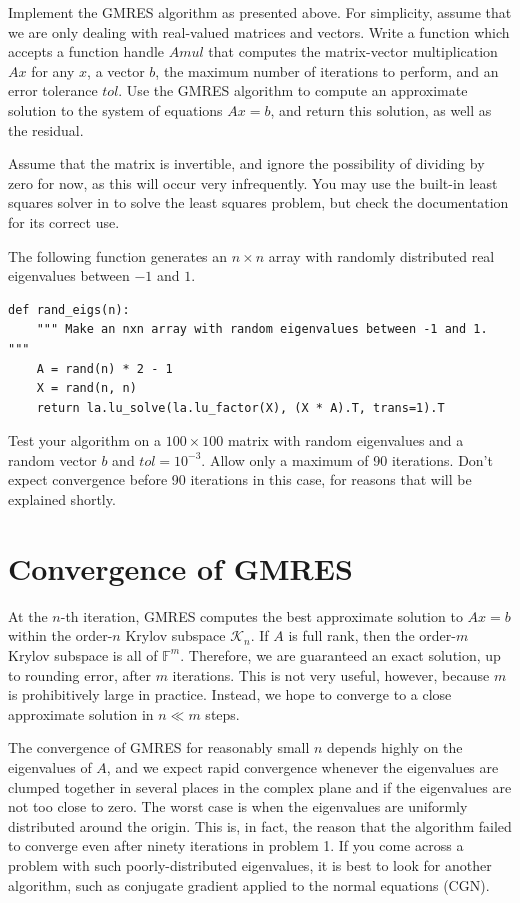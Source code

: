 \begin{problem}
Implement the GMRES algorithm as presented above. For simplicity, assume that we are only dealing with real-valued matrices and vectors.
Write a function  which accepts a function handle $Amul$ that computes the matrix-vector multiplication $Ax$ for any $x$,
a vector $b$, the maximum number of iterations to perform, and an error tolerance $tol$.
Use the GMRES algorithm to compute an approximate solution to the system of equations $Ax = b$, and return this solution, as well as
the residual.

Assume that the matrix is invertible, and ignore the possibility of dividing by zero for now, as this will occur very infrequently.
You may use the built-in least squares solver in  to solve the least squares problem, but check the documentation
for its correct use.

The following function generates an $n \times n$ array with randomly distributed real eigenvalues between $-1$ and $1$.
\begin{lstlisting}
def rand_eigs(n):
    """ Make an nxn array with random eigenvalues between -1 and 1. """
    A = rand(n) * 2 - 1
    X = rand(n, n)
    return la.lu_solve(la.lu_factor(X), (X * A).T, trans=1).T
\end{lstlisting}

Test your algorithm on a $100\times 100$ matrix with random eigenvalues and a random vector $b$ and $tol=10^{-3}$.
Allow only a maximum of 90 iterations.
Don't expect convergence before 90 iterations in this case, for reasons that will be explained shortly.
\label{prob:MyGMRES}
\end{problem}

\section*{Convergence of GMRES}
At the $n$-th iteration, GMRES computes the best approximate solution to $Ax = b$ within the order-$n$ Krylov subspace
$\mathcal{K}_n$.
If $A$ is full rank, then the order-$m$ Krylov subspace is all of  $\mathbb{F}^m$.
Therefore, we are guaranteed an exact solution, up to rounding error, after $m$ iterations.
This is not very useful, however, because $m$ is prohibitively large in practice.
Instead, we hope to converge to a close approximate solution in $n \ll m$ steps.

The convergence of GMRES for reasonably small $n$ depends highly on the eigenvalues of $A$, and we expect rapid convergence whenever
the eigenvalues are clumped together in several places in the complex plane and if the eigenvalues are not too close to zero.
The worst case is when the eigenvalues are uniformly distributed around the origin.
This is, in fact, the reason that the algorithm failed to converge even after ninety iterations in problem 1.
If you come across a problem with such poorly-distributed eigenvalues, it is best to look for another algorithm, such as conjugate
gradient applied to the normal equations (CGN).

